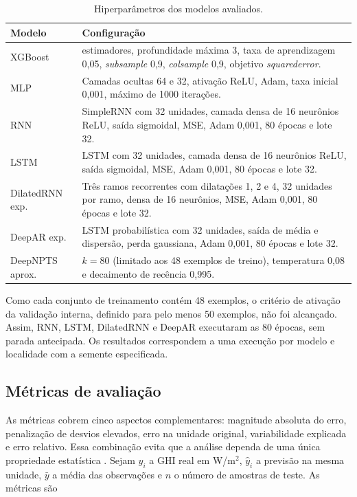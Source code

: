 \documentclass[11pt,a4paper]{article}
\begin{document}
\begin{table}[htbp]
\centering
\caption{Hiperparâmetros dos modelos avaliados.}
\label{tab:hiperparametros}
\begingroup
\small
\setlength{\tabcolsep}{4pt}
\renewcommand{\arraystretch}{1.06}
\begin{tabular}{>{\raggedright\arraybackslash}p{2.8cm}>{\raggedright\arraybackslash}p{11.8cm}}
\toprule
\textbf{Modelo} & \textbf{Configuração} \\
\midrule
XGBoost & 300 estimadores, profundidade máxima 3, taxa de aprendizagem 0,05, \textit{subsample} 0,9, \textit{colsample} 0,9, objetivo \textit{squarederror}. \\
MLP & Camadas ocultas 64 e 32, ativação ReLU, Adam, taxa inicial 0,001, máximo de 1000 iterações. \\
RNN & SimpleRNN com 32 unidades, camada densa de 16 neurônios ReLU, saída sigmoidal, MSE, Adam 0,001, 80 épocas e lote 32. \\
LSTM & LSTM com 32 unidades, camada densa de 16 neurônios ReLU, saída sigmoidal, MSE, Adam 0,001, 80 épocas e lote 32. \\
DilatedRNN exp. & Três ramos recorrentes com dilatações 1, 2 e 4, 32 unidades por ramo, densa de 16 neurônios, MSE, Adam 0,001, 80 épocas e lote 32. \\
DeepAR exp. & LSTM probabilística com 32 unidades, saída de média e dispersão, perda gaussiana, Adam 0,001, 80 épocas e lote 32. \\
DeepNPTS aprox. & $k=80$ (limitado aos 48 exemplos de treino), temperatura 0,08 e decaimento de recência 0,995. \\
\bottomrule
\end{tabular}
\endgroup
\end{table}

Como cada conjunto de treinamento contém 48 exemplos, o critério de ativação da validação interna, definido para pelo menos 50 exemplos, não foi alcançado. Assim, RNN, LSTM, DilatedRNN e DeepAR executaram as 80 épocas, sem parada antecipada. Os resultados correspondem a uma execução por modelo e localidade com a semente especificada.

\subsection{Métricas de avaliação}

As métricas cobrem cinco aspectos complementares: magnitude absoluta do erro, penalização de desvios elevados, erro na unidade original, variabilidade explicada e erro relativo. Essa combinação evita que a análise dependa de uma única propriedade estatística \cite{hyndman2006,voyant2022}. Sejam $y_i$ a GHI real em W/m$^2$, $\hat{y}_i$ a previsão na mesma unidade, $\bar{y}$ a média das observações e $n$ o número de amostras de teste. As métricas são
\end{document}

